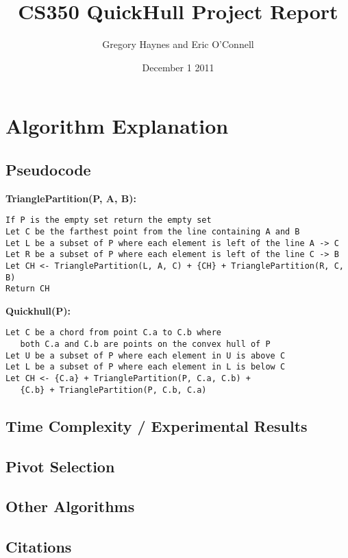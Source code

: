 \documentclass[11pt]{article}
\title{CS350 QuickHull Project Report}
\author{Gregory Haynes and Eric O'Connell}
\date{December 1 2011}
\begin{document}
\maketitle

\section{Algorithm Explanation}

\subsection{Pseudocode}

\textbf{TrianglePartition(P, A, B):}
\begin{verbatim}
If P is the empty set return the empty set
Let C be the farthest point from the line containing A and B
Let L be a subset of P where each element is left of the line A -> C
Let R be a subset of P where each element is left of the line C -> B
Let CH <- TrianglePartition(L, A, C) + {CH} + TrianglePartition(R, C, B)
Return CH
\end{verbatim}
\textbf{Quickhull(P):}
\begin{verbatim}
Let C be a chord from point C.a to C.b where 
   both C.a and C.b are points on the convex hull of P
Let U be a subset of P where each element in U is above C
Let L be a subset of P where each element in L is below C
Let CH <- {C.a} + TrianglePartition(P, C.a, C.b) + 
   {C.b} + TrianglePartition(P, C.b, C.a)
\end{verbatim}

\subsection{Time Complexity / Experimental Results}

\subsection{Pivot Selection}

\subsection{Other Algorithms}

\subsection{Citations}
\end{document}
